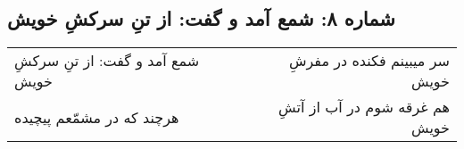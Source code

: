 \begin{center}
\section*{شماره ۸: شمع آمد و گفت: از تنِ سرکشِ خویش}
\label{sec:008}
\begin{longtable}{l p{0.5cm} r}
شمع آمد و گفت: از تنِ سرکشِ خویش
&&
سر میبینم فکنده در مفرشِ خویش
\\
هرچند که در مشمّعم پیچیده
&&
هم غرقه شوم در آب از آتشِ خویش
\\
\end{longtable}
\end{center}
